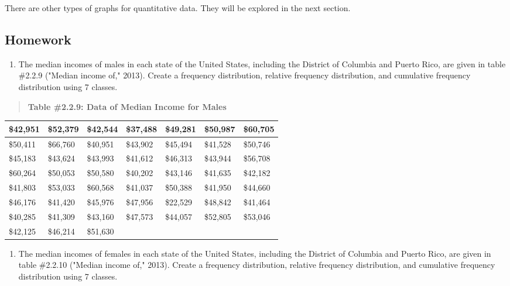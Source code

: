 \documentclass[]{book}
\providecommand{\tightlist}{%
  \setlength{\itemsep}{0pt}\setlength{\parskip}{0pt}}
\begin{document}
There are other types of graphs for quantitative data. They will be
explored in the next section.

\hypertarget{homework-5}{%
\subsection{Homework}\label{homework-5}}

\begin{enumerate}
\def\labelenumi{\arabic{enumi}.}
\tightlist
\item
  The median incomes of males in each state of the United States,
  including the District of Columbia and Puerto Rico, are given in
  table \#2.2.9 ("Median income of," 2013). Create a frequency
  distribution, relative frequency distribution, and cumulative
  frequency distribution using 7 classes.
\end{enumerate}

\begin{quote}
\textbf{Table \#2.2.9: Data of Median Income for Males}
\end{quote}

\begin{longtable}[]{@{}lllllll@{}}
\toprule
\$42,951 & \$52,379 & \$42,544 & \$37,488 & \$49,281 & \$50,987 & \$60,705\tabularnewline
\midrule
\endhead
\$50,411 & \$66,760 & \$40,951 & \$43,902 & \$45,494 & \$41,528 & \$50,746\tabularnewline
\$45,183 & \$43,624 & \$43,993 & \$41,612 & \$46,313 & \$43,944 & \$56,708\tabularnewline
\$60,264 & \$50,053 & \$50,580 & \$40,202 & \$43,146 & \$41,635 & \$42,182\tabularnewline
\$41,803 & \$53,033 & \$60,568 & \$41,037 & \$50,388 & \$41,950 & \$44,660\tabularnewline
\$46,176 & \$41,420 & \$45,976 & \$47,956 & \$22,529 & \$48,842 & \$41,464\tabularnewline
\$40,285 & \$41,309 & \$43,160 & \$47,573 & \$44,057 & \$52,805 & \$53,046\tabularnewline
\$42,125 & \$46,214 & \$51,630 & & & &\tabularnewline
\bottomrule
\end{longtable}

\begin{enumerate}
\def\labelenumi{\arabic{enumi}.}
\setcounter{enumi}{1}
\tightlist
\item
  The median incomes of females in each state of the United States,
  including the District of Columbia and Puerto Rico, are given in
  table \#2.2.10 ("Median income of," 2013). Create a frequency
  distribution, relative frequency distribution, and cumulative
  frequency distribution using 7 classes.
\end{enumerate}
\end{document}

